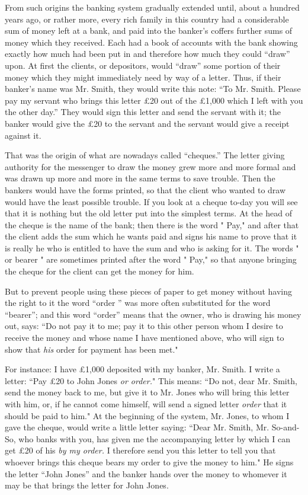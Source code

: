 \documentclass{book}
\begin{document}
From such origins the banking system gradually extended until, about a hundred years ago, or rather more, every rich family in this country had a considerable sum of money left at a bank, and paid into the banker’s coffers further sums of money which they received. Each had a book of accounts with the bank showing exactly how much had been put in and therefore how much they could “draw” upon. At first the clients, or depositors, would “draw” some portion of their money which they might immediately need by way of a letter. Thus, if their banker’s name was Mr. Smith, they would write this note: “To Mr. Smith. Please pay my servant who brings this letter £20 out of the £1,000 which I left with you the other day.” They would sign this letter and send the servant with it; the banker would give the £20 to the servant and the servant would give a receipt against it.

That was the origin of what are nowadays called “cheques.” The letter giving authority for the messenger to draw the money grew more and more formal and was drawn up more and more in the same terms to save trouble. Then the bankers would have the forms printed, so that the client who wanted to draw would have the least possible trouble. If you look at a cheque to-day you will see that it is nothing but the old letter put into the simplest terms. At the head of the cheque is the name of the bank; then there is the word " Pay," and after that the client adds the sum which he wants paid and signs his name to prove that it is really he who is entitled to have the sum and who is asking for it. The words " or bearer " are sometimes printed after the word " Pay," so that anyone bringing the cheque for the client can get the money for him.

But to prevent people using these pieces of paper to get money without having the right to it the word “order ” was more often substituted for the word “bearer”; and this word “order” means that the owner, who is drawing his money out, says: “Do not pay it to me; pay it to this other person whom I desire to receive the money and whose name I have mentioned above, who will sign to show that \emph{his} order for payment has been met."

For instance: I have £1,000 deposited with my banker, Mr. Smith. I write a letter: “Pay £20 to John Jones \emph{or order.}" This means: “Do not, dear Mr. Smith, send the money back to me, but give it to Mr. Jones who will bring this letter with him, or, if he cannot come himself, will send a signed letter \emph{order} that it should be paid to him." At the beginning of the system, Mr. Jones, to whom I gave the cheque, would write a little letter saying: “Dear Mr. Smith, Mr. So-and-So, who banks with you, has given me the accompanying letter by which I can get £20 of his \emph{by my order.} I therefore send you this letter to tell you that whoever brings this cheque bears my order to give the money to him." He signs the letter “John Jones” and the banker hands over the money to whomever it may be that brings the letter for John Jones.
\end{document}
